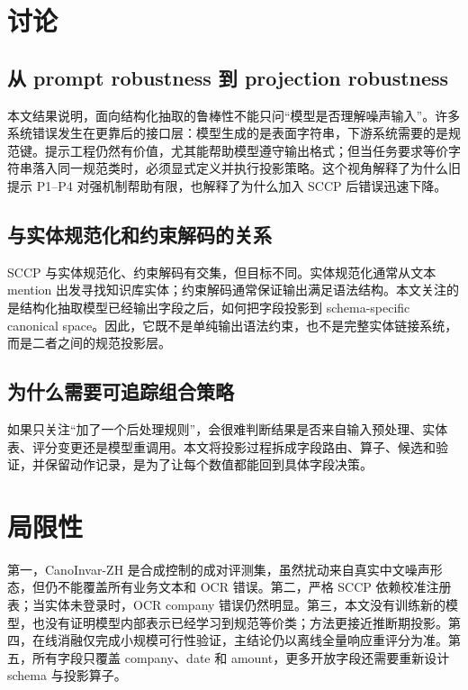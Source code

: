 ﻿\documentclass[UTF8,11pt,a4paper]{ctexart}
\newcommand{\method}{SCCP}
\newcommand{\dataset}{CanoInvar-ZH}
\begin{document}
\section{讨论}

\subsection{从 prompt robustness 到 projection robustness}

本文结果说明，面向结构化抽取的鲁棒性不能只问“模型是否理解噪声输入”。许多系统错误发生在更靠后的接口层：模型生成的是表面字符串，下游系统需要的是规范键。提示工程仍然有价值，尤其能帮助模型遵守输出格式；但当任务要求等价字符串落入同一规范类时，必须显式定义并执行投影策略。这个视角解释了为什么旧提示 P1--P4 对强机制帮助有限，也解释了为什么加入 \method{} 后错误迅速下降。

\subsection{与实体规范化和约束解码的关系}

\method{} 与实体规范化、约束解码有交集，但目标不同。实体规范化通常从文本 mention 出发寻找知识库实体；约束解码通常保证输出满足语法结构。本文关注的是结构化抽取模型已经输出字段之后，如何把字段投影到 schema-specific canonical space。因此，它既不是单纯输出语法约束，也不是完整实体链接系统，而是二者之间的规范投影层。

\subsection{为什么需要可追踪组合策略}

如果只关注“加了一个后处理规则”，会很难判断结果是否来自输入预处理、实体表、评分变更还是模型重调用。本文将投影过程拆成字段路由、算子、候选和验证，并保留动作记录，是为了让每个数值都能回到具体字段决策。

\section{局限性}

第一，\dataset{} 是合成控制的成对评测集，虽然扰动来自真实中文噪声形态，但仍不能覆盖所有业务文本和 OCR 错误。第二，严格 \method{} 依赖校准注册表；当实体未登录时，OCR company 错误仍然明显。第三，本文没有训练新的模型，也没有证明模型内部表示已经学习到规范等价类；方法更接近推断期投影。第四，在线消融仅完成小规模可行性验证，主结论仍以离线全量响应重评分为准。第五，所有字段只覆盖 company、date 和 amount，更多开放字段还需要重新设计 schema 与投影算子。
\end{document}
